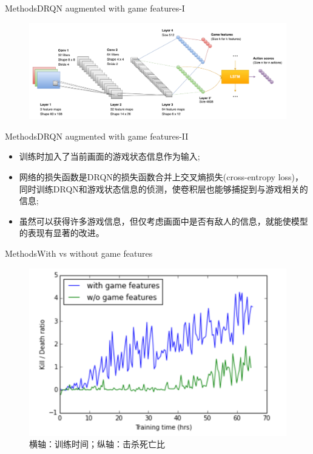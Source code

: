 \documentclass[10pt]{beamer}
\begin{document}
	\begin{frame}{Methods}{DRQN augmented with game features-I}
		\begin{figure}
			\centering
			\includegraphics[width=0.9\linewidth]{pictures/drqn-with-game-features}
		\end{figure}
		
	\end{frame}

	\begin{frame}{Methods}{DRQN augmented with game features-II}
		\begin{itemize}
			\item 训练时加入了当前画面的游戏状态信息作为输入;
			
			\item 网络的损失函数是DRQN的损失函数合并上交叉熵损失(cross-entropy loss)，同时训练DRQN和游戏状态信息的侦测，使卷积层也能够捕捉到与游戏相关的信息;
			
			\item 虽然可以获得许多游戏信息，但仅考虑画面中是否有敌人的信息，就能使模型的表现有显著的改进。
		\end{itemize}
	\end{frame}

	\begin{frame}{Methods}{With vs without game features}
		\begin{figure}
			\centering
			\includegraphics[width=0.7\linewidth]{pictures/with-game-features-result}
			\caption{横轴：训练时间；纵轴：击杀死亡比}
			\label{fig:with-game-features-result}
		\end{figure}
	\end{frame}
\end{document}

